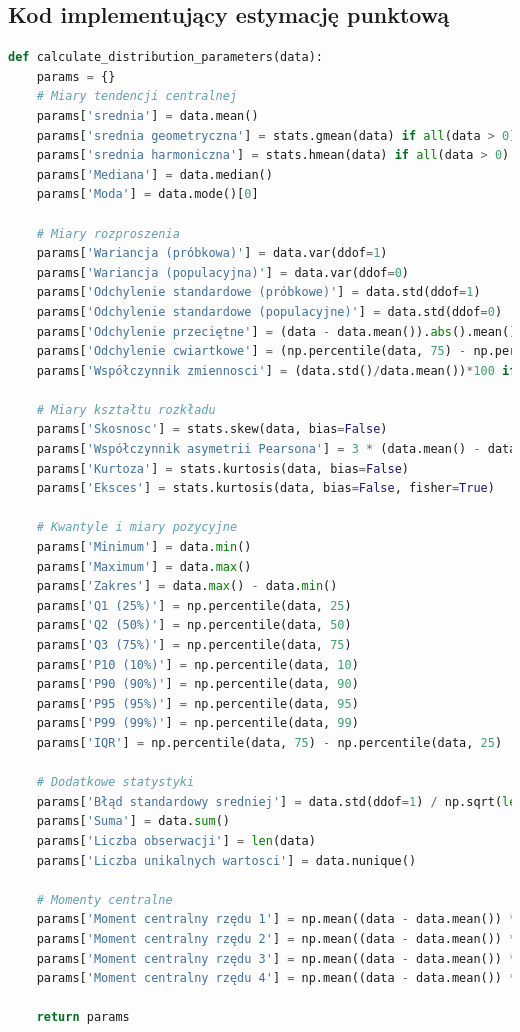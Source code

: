 \documentclass[12pt,a4paper]{article}
\begin{document}
\subsection{Kod implementujący estymację punktową}
\begin{lstlisting}[language=Python, caption=Funkcja do obliczania parametrów rozkładu]
def calculate_distribution_parameters(data):
    params = {}
    # Miary tendencji centralnej
    params['srednia'] = data.mean()
    params['srednia geometryczna'] = stats.gmean(data) if all(data > 0) else np.nan
    params['srednia harmoniczna'] = stats.hmean(data) if all(data > 0) else np.nan
    params['Mediana'] = data.median()
    params['Moda'] = data.mode()[0]

    # Miary rozproszenia
    params['Wariancja (próbkowa)'] = data.var(ddof=1)
    params['Wariancja (populacyjna)'] = data.var(ddof=0)
    params['Odchylenie standardowe (próbkowe)'] = data.std(ddof=1)
    params['Odchylenie standardowe (populacyjne)'] = data.std(ddof=0)
    params['Odchylenie przeciętne'] = (data - data.mean()).abs().mean()
    params['Odchylenie cwiartkowe'] = (np.percentile(data, 75) - np.percentile(data, 25))/2
    params['Współczynnik zmiennosci'] = (data.std()/data.mean())*100 if data.mean() != 0 else np.nan

    # Miary kształtu rozkładu
    params['Skosnosc'] = stats.skew(data, bias=False)
    params['Współczynnik asymetrii Pearsona'] = 3 * (data.mean() - data.median()) / data.std() if data.std() != 0 else np.nan
    params['Kurtoza'] = stats.kurtosis(data, bias=False)
    params['Eksces'] = stats.kurtosis(data, bias=False, fisher=True)  

    # Kwantyle i miary pozycyjne
    params['Minimum'] = data.min()
    params['Maximum'] = data.max()
    params['Zakres'] = data.max() - data.min()
    params['Q1 (25%)'] = np.percentile(data, 25)
    params['Q2 (50%)'] = np.percentile(data, 50)
    params['Q3 (75%)'] = np.percentile(data, 75)
    params['P10 (10%)'] = np.percentile(data, 10)
    params['P90 (90%)'] = np.percentile(data, 90)
    params['P95 (95%)'] = np.percentile(data, 95)
    params['P99 (99%)'] = np.percentile(data, 99)
    params['IQR'] = np.percentile(data, 75) - np.percentile(data, 25)

    # Dodatkowe statystyki
    params['Błąd standardowy sredniej'] = data.std(ddof=1) / np.sqrt(len(data))
    params['Suma'] = data.sum()
    params['Liczba obserwacji'] = len(data)
    params['Liczba unikalnych wartosci'] = data.nunique()

    # Momenty centralne
    params['Moment centralny rzędu 1'] = np.mean((data - data.mean()) ** 1)
    params['Moment centralny rzędu 2'] = np.mean((data - data.mean()) ** 2)
    params['Moment centralny rzędu 3'] = np.mean((data - data.mean()) ** 3)
    params['Moment centralny rzędu 4'] = np.mean((data - data.mean()) ** 4)

    return params
\end{lstlisting}
\end{document}
